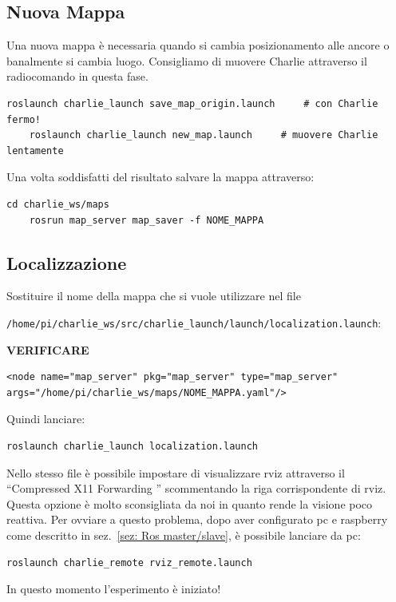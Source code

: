 \subsection*{Nuova Mappa}
Una nuova mappa \`e necessaria quando si cambia posizionamento alle ancore o banalmente si cambia luogo. Consigliamo di muovere Charlie attraverso il radiocomando in questa fase.
\begin{lstlisting}[style=bash]
	roslaunch charlie_launch save_map_origin.launch		# con Charlie fermo!
	roslaunch charlie_launch new_map.launch 	# muovere Charlie lentamente
\end{lstlisting}

Una volta soddisfatti del risultato salvare la mappa attraverso:
\begin{lstlisting}[style=bash]
	cd charlie_ws/maps
	rosrun map_server map_saver -f NOME_MAPPA
\end{lstlisting}

\subsection*{Localizzazione}
Sostituire il nome della mappa che si vuole utilizzare nel file

\verb|/home/pi/charlie_ws/src/charlie_launch/launch/localization.launch|:

\huge \textbf{VERIFICARE} \normalsize 
\begin{lstlisting}[style=xml, firstnumber=11]
	<node name="map_server" pkg="map_server" type="map_server" args="/home/pi/charlie_ws/maps/NOME_MAPPA.yaml"/>
\end{lstlisting}

Quindi lanciare:
\begin{lstlisting}[style=bash]
	roslaunch charlie_launch localization.launch
\end{lstlisting}

Nello stesso file \`e possibile impostare di visualizzare rviz attraverso il ``Compressed X11 Forwarding '' scommentando la riga corrispondente di rviz. Questa opzione \`e molto sconsigliata da noi in quanto rende la visione poco reattiva. Per ovviare a questo problema, dopo aver configurato pc e raspberry come descritto in sez.~\ref{sez: Ros master/slave}, \`e possibile lanciare da pc:

\begin{lstlisting}[style=bashPC]
	roslaunch charlie_remote rviz_remote.launch
\end{lstlisting}
In questo momento l'esperimento \`e iniziato!


